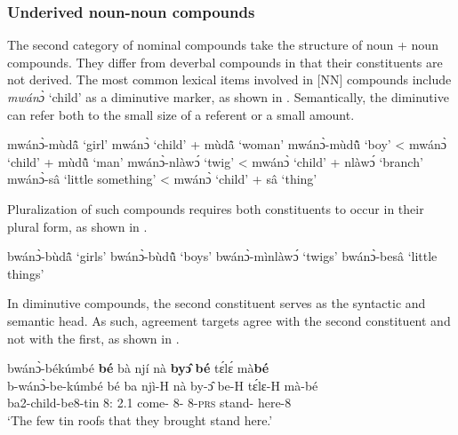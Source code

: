 \subsubsection{Underived noun-noun compounds}
\label{sec:NNCompound}

The second category of nominal compounds take the structure of noun + noun compounds. They differ from deverbal compounds in that their constituents are not derived.  The most common lexical items involved in [NN] compounds include {\itshape mwánɔ̀} `child'  as a diminutive marker, as shown in . Semantically, the diminutive can refer both to the small size of a referent or a small amount.

\ea \label{CompoundNN1}
\ea  mwánɔ̀-mùdã̂ `girl' mwánɔ̀ `child' + mùdã̂ `woman'
\ex mwánɔ̀-mùdũ̂ `boy' < mwánɔ̀ `child' + mùdũ̂ `man'
\ex mwánɔ̀-nlàwɔ́ `twig' < mwánɔ̀ `child' + nlàwɔ́ `branch'
\ex mwánɔ̀-sâ `little something' < mwánɔ̀ `child' + sâ `thing'
\z
\z

Pluralization of such compounds requires both constituents to occur in their plural form, as shown in .

\ea \label{CompoundNN1a}
\ea  bwánɔ̀-bùdã̂ `girls'
\ex bwánɔ̀-bùdũ̂ `boys'
\ex bwánɔ̀-mìnlàwɔ́ `twigs'
\ex bwánɔ̀-besâ `little things' 
\z
\z

In diminutive compounds, the second constituent serves as the syntactic and semantic head. As such, agreement targets agree with the second constituent and not with the first, as shown in .

\ea \label{CompoundNNAGR}
\ea \label{CompoundNNAGR1}
 \glll  bwánɔ̀-békúmbé {\bfseries bé} bà njí nà {\bfseries byɔ̂} {\bfseries bé} tɛ́lɛ́ mà{\bfseries bé}  \\
         b-wánɔ̀-be-kúmbé bé ba njì-H nà by-ɔ̂ be-H tɛ́lɛ-H mà-bé \\
          ba2-child-be8-tin 8:{\ATT} 2.{\PST}1 come-{\R} {\COM} 8-{\OBJ} 8-\textsc{prs} stand-{\R} here-8   \\
    \trans `The few tin roofs that they brought stand here.'
\z
\z


